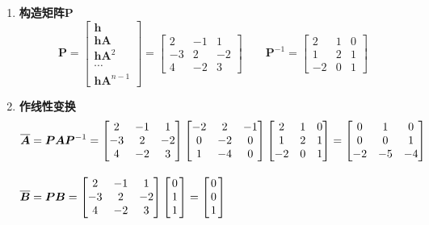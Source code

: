 \begin{enumerate}[\textbf{步骤} 1 ]
	\item \textbf{构造矩阵$\bm{P}$}
	\begin{equation}
		\bm{P} = 
		\begin{bmatrix}
			\bm{h}\\
			\bm{hA}\\
			\bm{hA}^2\\
			\cdots\\
			\bm{hA}^{n-1}
		\end{bmatrix}
	= 
	\begin{bmatrix}
		2 & -1 & 1\\
		-3 & 2 & -2\\
		4 & -2 & 3
	\end{bmatrix}
	\qquad \bm{P}^{-1} =
	\begin{bmatrix}
		2 & 1 & 0\\
		1 & 2 & 1\\
		-2 & 0 & 1
	\end{bmatrix}
	\end{equation}
	\item \textbf{作线性变换}
	\begin{align*}
		\overline{\bm{A}} & = \bm{PAP}^{-1} =
		\begin{bmatrix}
			2 & -1 & 1\\
			-3 & 2 & -2\\
			4 & -2 & 3
		\end{bmatrix}
		\begin{bmatrix}
			-2 & 2 & -1\\
			0 & -2 & 0\\
			1 & -4 & 0
		\end{bmatrix}
		\begin{bmatrix}
			2 & 1 & 0\\
			1 & 2 & 1\\
			-2 & 0 & 1
		\end{bmatrix}
		= 
		\begin{bmatrix}
			0 & 1 & 0\\
			0 & 0 & 1\\
			-2 & -5 & -4
		\end{bmatrix}
		\\[1em]
		\overline{\bm{B}} & = \bm{PB} = 
		\begin{bmatrix}
			2 & -1 & 1\\
			-3 & 2 & -2\\
			4 & -2 & 3
		\end{bmatrix}
		\begin{bmatrix}
			\hspace*{0.5mm}0\hspace*{0.5mm}\\
			1\\
			1
		\end{bmatrix}
		= 
		\begin{bmatrix}
			\hspace*{0.5mm}0\hspace*{0.5mm}\\
			0\\
			1
		\end{bmatrix}
		\\
	\end{align*}
\end{enumerate}

